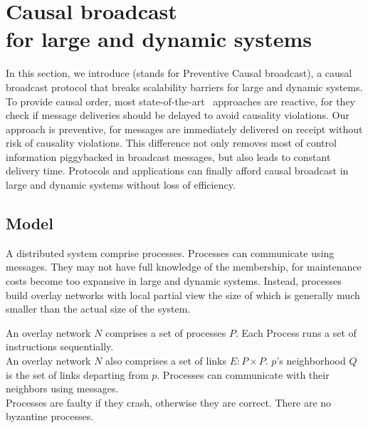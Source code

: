 
\section{Causal broadcast\\for large and dynamic systems}
\label{sec:proposal}

In this section, we introduce \CBROADCAST (stands for Preventive Causal
broadcast), a causal broadcast protocol that breaks scalability barriers for
large and dynamic systems.
To provide causal order, most
state-of-the-art~\cite{almeida2008interval,birman1987reliable,fidge1988timestamps,hadzilacos1993fault,mattern1989virtual,mostefaoui2017probabilistic,singhal1992efficient}
approaches are reactive, for they check if message deliveries should be delayed
to avoid causality violations. Our approach is preventive, for messages are
immediately delivered on receipt without risk of causality violations. This
difference not only removes most of control information piggybacked in broadcast
messages, but also leads to constant delivery time. Protocols and applications
can finally afford causal broadcast in large and dynamic systems without loss
of efficiency.


\subsection{Model}

A distributed system comprise processes. Processes can communicate using
messages. They may not have full knowledge of the membership, for maintenance
costs become too expansive in large and dynamic systems. Instead, processes
build overlay networks with local partial view the size of which is generally
much smaller than the actual size of the system.

\begin{definition}
  An overlay network $N$ comprises a set of processes $P$. Each Process runs a
  set of instructions sequentially. \\
  An overlay network $N$ also comprises a set of links $E: P \times P$. $p$'s
  neighborhood $Q$ is the set of links departing from $p$. Processes can
  communicate with their neighbors using messages. \\
  Processes are faulty if they crash, otherwise they are correct. %
  There are no byzantine processes.
\end{definition}

